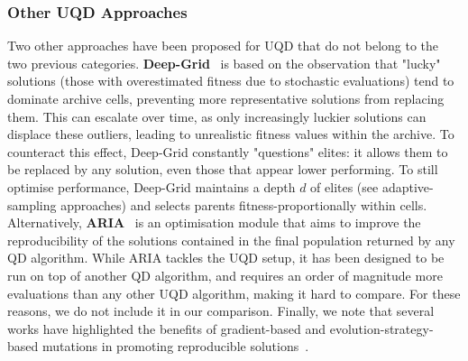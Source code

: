 \subsubsection{Other UQD Approaches}  \label{sec:deep_grid}
Two other approaches have been proposed for UQD that do not belong to the two previous categories. 
\textbf{Deep-Grid}~\cite{flageat2020fast} is based on the observation that "lucky" solutions (those with overestimated fitness due to stochastic evaluations) tend to dominate archive cells, preventing more representative solutions from replacing them. This can escalate over time, as only increasingly luckier solutions can displace these outliers, leading to unrealistic fitness values within the archive.
To counteract this effect, Deep-Grid constantly "questions" elites: it allows them to be replaced by any solution, even those that appear lower performing. To still optimise performance, Deep-Grid maintains a depth $d$ of elites (see adaptive-sampling approaches) and selects parents fitness-proportionally within cells.
Alternatively, \textbf{ARIA}~\cite{grillotti2023don} is an optimisation module that aims to improve the reproducibility of the solutions contained in the final population returned by any QD algorithm. While ARIA tackles the UQD setup, it has been designed to be run on top of another QD algorithm, and requires an order of magnitude more evaluations than any other UQD algorithm, making it hard to compare. 
For these reasons, we do not include it in our comparison. 
Finally, we note that several works have highlighted the benefits of gradient-based and evolution-strategy-based mutations in promoting reproducible solutions~\cite{colas2020scaling, flageat2023empirical, flageat2024enhancing, mace2023quality, faldor2023synergizing, tjanaka2023training}. 
